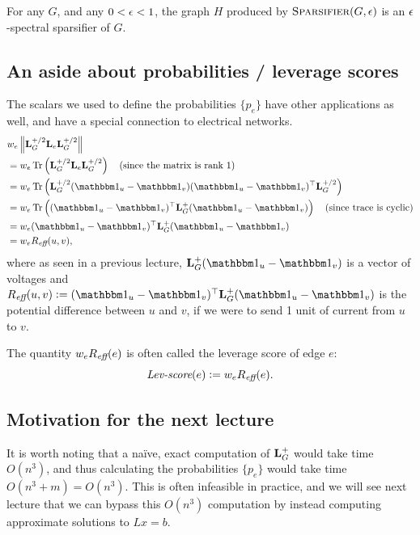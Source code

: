 \documentclass[11pt]{article}
\begin{document}
\begin{theorem}
\label{thm:sparsifier}
For any $G$, and any $0 < \epsilon < 1$, the graph $H$ produced by
$\textsc{Sparsifier}(G,\epsilon)$ is an $\epsilon$-spectral sparsifier of $G$.
\end{theorem}

\subsection{An aside about probabilities / leverage scores}

The scalars we used to define the probabilities $\{p_e\}$ have other
applications as well, and have a special connection to electrical networks.
\begin{align*}
&w_e \norm{\V{L}_G^\phalf \V{L}_e \V{L}_G^\phalf} \\
&= w_e \tr{\V{L}_G^\phalf \V{L}_e \V{L}_G^\phalf}
    \text{ ~ (since the matrix is rank 1)} \\
&= w_e \tr{\V{L}_G^\phalf (\ones_u - \ones_v)(\ones_u - \ones_v)^\T \V{L}_G^\phalf} \\
&= w_e \tr{(\ones_u - \ones_v)^\T \V{L}_G^+ (\ones_u - \ones_v)}
    \text{ ~ (since trace is cyclic)} \\
&= w_e (\ones_u - \ones_v)^\T \V{L}_G^+ (\ones_u - \ones_v) \\
&= w_e \Reff(u,v),
\end{align*}
where as seen in a previous lecture, $\V{L}_G^+(\ones_u - \ones_v)$ is a vector of
voltages and $\Reff(u,v) := (\ones_u - \ones_v)^\T \V{L}_G^+ (\ones_u - \ones_v)$ is
the potential difference between $u$ and $v$, if we were to send 1 unit of
current from $u$ to $v$.

The quantity $w_e {R_{\textit{eff}}}(e)$ is often called the leverage score of edge $e$:
\[ \textit{Lev-score}(e) := w_e {R_{\textit{eff}}}(e). \]

\subsection{Motivation for the next lecture}

It is worth noting that a na\"ive, exact computation of $\V{L}_G^+$ would take time
$O(n^3)$, and thus calculating the probabilities $\{p_e\}$ would take time
$O(n^3 + m) = O(n^3)$. This is often infeasible in practice, and we will see
next lecture that we can bypass this $O(n^3)$ computation by instead computing
approximate solutions to $L x = b$.



\end{document}
